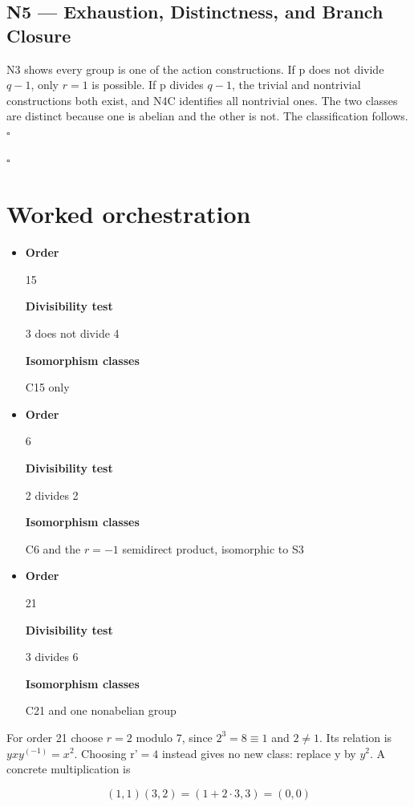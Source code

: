 \documentclass[preprint,12pt,aps,pra,showkeys,amsmath,amssymb,superscriptaddress,floatfix]{revtex4-2}
\theoremstyle{definition}
\theoremstyle{remark}
\begin{document}
\subsection{N5 --- Exhaustion, Distinctness, and Branch
Closure}\label{n5-exhaustion-distinctness-and-branch-closure}

N3 shows every group is one of the action constructions. If p does not
divide \(q-1\), only \(r=1\) is possible. If p divides \(q-1\), the
trivial and nontrivial constructions both exist, and N4C identifies all
nontrivial ones. The two classes are distinct because one is abelian and
the other is not. The classification follows. \(\square\)

\hfill$\square$

\section{Worked orchestration}

\begin{itemize}
\item
  \textbf{Order}

  15

  \textbf{Divisibility test}

  3 does not divide 4

  \textbf{Isomorphism classes}

  C15 only
\item
  \textbf{Order}

  6

  \textbf{Divisibility test}

  2 divides 2

  \textbf{Isomorphism classes}

  C6 and the \(r=-1\) semidirect product, isomorphic to S3
\item
  \textbf{Order}

  21

  \textbf{Divisibility test}

  3 divides 6

  \textbf{Isomorphism classes}

  C21 and one nonabelian group
\end{itemize}

For order 21 choose \(r=2\) modulo 7, since \(2^{3}=8\equiv 1\) and
\(2\ne 1\). Its relation is \(yxy^{(-1)}=x^{2}\). Choosing r'\(=4\)
instead gives no new class: replace y by \(y^{2}\). A concrete
multiplication is

\[(1,1)(3,2)=(1+2\cdot3,3)=(0,0)\]
\end{document}
